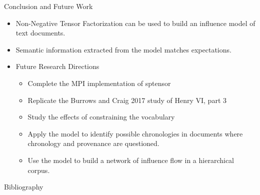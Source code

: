\documentclass[handout]{beamer}
\begin{document}
\begin{frame}{Conclusion and Future Work}
  \begin{itemize}[<+->]
    \item Non-Negative Tensor Factorization can be used to build an
      influence model of text documents.
    \item Semantic information extracted from the model matches
      expectations.
    \item Future Research Directions
      \begin{itemize}
      \item Complete the MPI implementation of sptensor
      \item Replicate the Burrows and Craig 2017 study of Henry VI,
        part 3
      \item Study the effects of constraining the vocabulary
      \item Apply the model to identify possible chronologies in
        documents where chronology and provenance are questioned.
      \item Use the model to build a network of influence flow in a
        hierarchical corpus.
      \end{itemize}
  \end{itemize}
\end{frame}

\begin{frame}[allowframebreaks]{Bibliography}
{}

\end{frame}
\end{document}
